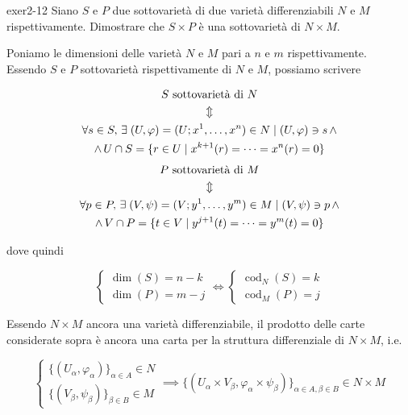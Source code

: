 {exer2-12}
{
Siano $ S $ e $ P $ due sottovarietà di due varietà differenziabili $ N $ e $ M $ rispettivamente. Dimostrare che $ S \times P $ è una sottovarietà di $ N \times M $.
}
{
Poniamo le dimensioni delle varietà $ N $ e $ M $ pari a $ n $ e $ m $ rispettivamente. \\
Essendo $ S $ e $ P $ sottovarietà rispettivamente di $ N $ e $ M $, possiamo scrivere

\begin{gather}
	S \text{ sottovarietà di } N \nonumber \\
	\Updownarrow \\
	\forall s \in S, \, \exists \; (U,\varphi) = (U; x^{1},\dots,x^{n}) \in N \mid (U,\varphi) \ni s \, \wedge \nonumber \\
	\wedge \, U \cap S = \{ r \in U \mid x^{k+1}(r) = \dots = x^{n}(r) = 0 \} \nonumber
\end{gather}
%
\begin{gather}
	P \text{ sottovarietà di } M \nonumber \\
	\Updownarrow \\
	\forall p \in P, \, \exists \; (V,\psi) = (V; y^{1},\dots,y^{m}) \in M \mid (V,\psi) \ni p \, \wedge \nonumber \\
	\wedge \, V \cap P = \{ t \in V \mid y^{j+1}(t) = \dots = y^{m}(t) = 0 \} \nonumber
\end{gather}

dove quindi

\begin{equation}
	\begin{cases}
		\dim(S) = n - k \\
		\dim(P) = m - j
	\end{cases} %
	\iff %
	\begin{cases}
		\operatorname{cod}_{N}(S) = k \\
		\operatorname{cod}_{M}(P) = j
	\end{cases}
\end{equation}

Essendo $ N \times M $ ancora una varietà differenziabile, il prodotto delle carte considerate sopra è ancora una carta per la struttura differenziale di $ N \times M $, i.e.

\begin{equation}
	\begin{cases}
		\{(U_{\alpha},\varphi_{\alpha})\}_{\alpha \in A} \in N \\
		\{(V_{\beta},\psi_{\beta})\}_{\beta \in B} \in M
	\end{cases} %
	\implies %
	\{(U_{\alpha} \times V_{\beta}, \varphi_{\alpha} \times \psi_{\beta})\}_{\alpha \in A, \beta \in B} \in N \times M
\end{equation}

}
